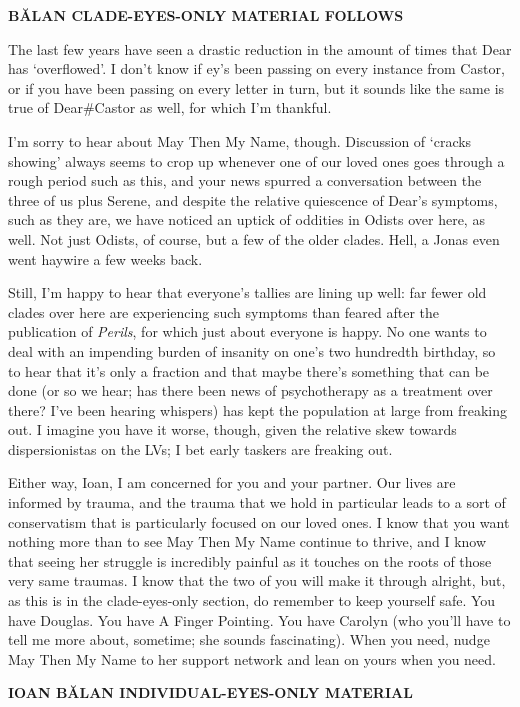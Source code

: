 \textbf{BĂLAN CLADE-EYES-ONLY MATERIAL FOLLOWS}

The last few years have seen a drastic reduction in the amount of times that Dear has `overflowed'. I don't know if ey's been passing on every instance from Castor, or if you have been passing on every letter in turn, but it sounds like the same is true of Dear\#Castor as well, for which I'm thankful.

I'm sorry to hear about May Then My Name, though. Discussion of `cracks showing' always seems to crop up whenever one of our loved ones goes through a rough period such as this, and your news spurred a conversation between the three of us plus Serene, and despite the relative quiescence of Dear's symptoms, such as they are, we have noticed an uptick of oddities in Odists over here, as well. Not just Odists, of course, but a few of the older clades. Hell, a Jonas even went haywire a few weeks back.

Still, I'm happy to hear that everyone's tallies are lining up well: far fewer old clades over here are experiencing such symptoms than feared after the publication of \emph{Perils}, for which just about everyone is happy. No one wants to deal with an impending burden of insanity on one's two hundredth birthday, so to hear that it's only a fraction and that maybe there's something that can be done (or so we hear; has there been news of psychotherapy as a treatment over there? I've been hearing whispers) has kept the population at large from freaking out. I imagine you have it worse, though, given the relative skew towards dispersionistas on the LVs; I bet early taskers are freaking out.

Either way, Ioan, I am concerned for you and your partner. Our lives are informed by trauma, and the trauma that we hold in particular leads to a sort of conservatism that is particularly focused on our loved ones. I know that you want nothing more than to see May Then My Name continue to thrive, and I know that seeing her struggle is incredibly painful as it touches on the roots of those very same traumas. I know that the two of you will make it through alright, but, as this is in the clade-eyes-only section, do remember to keep yourself safe. You have Douglas. You have A Finger Pointing. You have Carolyn (who you'll have to tell me more about, sometime; she sounds fascinating). When you need, nudge May Then My Name to her support network and lean on yours when you need.

\textbf{IOAN BĂLAN INDIVIDUAL-EYES-ONLY MATERIAL}

